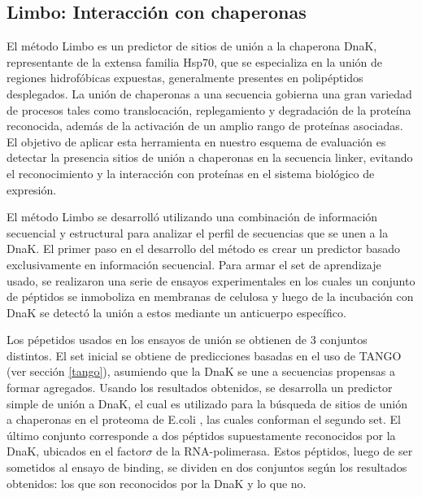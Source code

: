 \subsection{Limbo: Interacción con chaperonas} \label{limbo}
El método Limbo \cite{van2009accurate} es un predictor de sitios de unión a la chaperona DnaK, representante de la extensa familia Hsp70, que se especializa en la unión de regiones hidrofóbicas expuestas, generalmente
presentes en polipéptidos desplegados. La unión de chaperonas a una secuencia gobierna una gran variedad de procesos tales como translocación, replegamiento y degradación de la proteína reconocida,
además de la activación de un amplio rango de proteínas asociadas.
El objetivo de aplicar esta herramienta en nuestro esquema de evaluación es detectar la presencia sitios de unión a chaperonas en la secuencia linker, 
evitando el reconocimiento y la interacción con proteínas en el sistema biológico de expresión.

El método Limbo se desarrolló utilizando una combinación de información secuencial y estructural para analizar el perfil de secuencias que se unen a la DnaK.
El primer paso en el desarrollo del método es crear un predictor basado exclusivamente en información secuencial.
Para armar el set de aprendizaje usado, se realizaron una serie de ensayos experimentales en los cuales un conjunto de péptidos se inmoboliza en membranas de celulosa 
y luego de la incubación con DnaK se detectó la unión a estos mediante un anticuerpo específico.

Los pépetidos usados en los ensayos de unión se obtienen de 3 conjuntos distintos. El set inicial se obtiene de predicciones basadas en el uso de TANGO \cite{fernandez2004prediction} (ver sección \ref{tango}),
asumiendo que la DnaK se une a secuencias propensas a formar agregados.
Usando los resultados obtenidos, se desarrolla un predictor simple de unión a DnaK, el cual es utilizado para la búsqueda de sitios de unión a chaperonas en el proteoma de E.coli 
, las cuales conforman el segundo set. El último conjunto corresponde a dos péptidos supuestamente reconocidos por la DnaK, ubicados en el factor$\sigma$ de la RNA-polimerasa.
Estos péptidos, luego de ser sometidos al ensayo de binding, se dividen en dos conjuntos según los resultados obtenidos:
los que son reconocidos por la DnaK y lo que no. 

